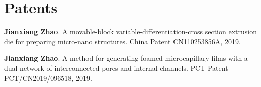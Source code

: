\section*{Patents}
\begin{pubcounter}
\item \textbf{Jianxiang Zhao}. A movable-block variable-differentiation-cross section extrusion die for preparing micro-nano structures. China Patent CN110253856A, 2019.
\item \textbf{Jianxiang Zhao}. A method for generating foamed microcapillary films with a dual network of interconnected pores and internal channels. PCT Patent PCT/CN2019/096518, 2019.
\end{pubcounter}
